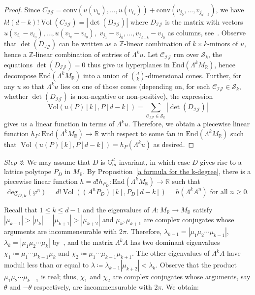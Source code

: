 \documentclass[11pt,a4paper]{article}
\theoremstyle{plain}
\theoremstyle{remark}
\theoremstyle{custombold}
\DeclareMathOperator{\vol}{Vol}
\begin{document}
\begin{proof}
Since $C_{\mathcal{I}\mathcal{J}}=\mathrm{conv}(u(v_{i_0}),\ldots,u(v_{i_k}))+\mathrm{conv}(v_{j_0},\ldots,v_{j_{d-k}})$, we have $k!(d-k)!\vol(C_{\mathcal{I}\mathcal{J}})=|\det (D_{\mathcal{I}\mathcal{J}})|$ where $D_{\mathcal{I}\mathcal{J}}$ is the matrix with vectors $u(v_{i_1}-v_{i_0}),\ldots,u(v_{i_k}-v_{i_0}),$  $v_{j_1}-v_{j_0},\ldots,v_{j_{d-k}}-v_{j_0}$ as columns, see~\cite[Lemma~2.5]{Huber-Sturmfels-1995}. Observe that $\det (D_{\mathcal I\mathcal J})$ can be written as a $\mathbb Z$-linear combination of $k\times k$-minors of $u$, hence a $\mathbb Z$-linear combination of entries of $\Lambda^ku$. Let $\mathcal{C}_{\mathcal{I}\mathcal{J}}$ run over $\mathcal{S}_k$, the equations $\det (D_{\mathcal{I}\mathcal{J}})=0$ thus give us hyperplanes in $\mathrm{End}(\Lambda^k M_\mathbb R)$, hence decompose $\mathrm{End}(\Lambda^k M_\mathbb R)$ into a union of $\binom{d}{k}$-dimensional cones. Further, for any $u$ so that $\Lambda^ku$ lies on one of those cones (depending on, for each $\mathcal{C}_{\mathcal{I}\mathcal{J}}\in \mathcal{S}_k$, whether $\det(D_{\mathcal{I}\mathcal{J}})$ is non-negative or non-positive), the expression 
$$\mathrm{Vol}(u(P)[k],P[d-k])=\sum_{\mathcal{C}_{\mathcal{I}\mathcal{J}}\in \mathcal{S}_k}|\det(D_{\mathcal{\mathcal{I}\mathcal{J}}})|$$
gives us a linear function in terms of $\Lambda^ku$. Therefore, we obtain a piecewise linear function $h_P\colon\mathrm{End}(\Lambda^kM_{\mathbb R})\rightarrow\mathbb R$ with respect to some fan in $\mathrm{End}(\Lambda^k M_\mathbb R)$ such that  $\vol(u(P)[k],P[d-k])=h_P(\Lambda^ku)$ as desired.
\end{proof}

\medskip
\noindent
\emph{Step 2}: We may assume that $D$ is $\mathbb G_m^d$-invariant, in which case $D$ gives rise to a lattice polytope $P_
D$ in $M_\mathbb R$. By Proposition~\ref{a formula for the k-degree}, there is a piecewise linear function $h=d!h_{P_D}\colon \mathrm{End}(\Lambda^kM_\mathbb R)\rightarrow\mathbb R$ such that 
$$\mathrm{deg}_{D,k}(\varphi^n)=d!\vol((A^nP_D)[k],P_D[d-k])=h(\Lambda^kA^n)\text{ for all }n\geq0.$$


Recall that $1\leq k\leq d-1$ and the eigenvalues of $A\colon M_\mathbb R\rightarrow M_\mathbb R$ satisfy $|\mu_{k-1}|>|\mu_k|=|\mu_{k+1}|>|\mu_{k+2}|$  and $\mu_{k},\mu_{k+1}$ are complex conjugates whose arguments are incommensurable with $2\pi$. Therefore, $\lambda_{k-1}=|\mu_1\mu_2\cdots\mu_{k-1}|$, $\lambda_k=|\mu_1\mu_2\cdots\mu_{k}|$ by~\cite[Corollary~B]{Favre-Wulcan-2012}, and the matrix $\Lambda^kA$ has two dominant eigenvalues $\chi_{1}\coloneqq \mu_1\cdots\mu_{k-1}\mu_{k}$ and $\chi_{2}\coloneqq \mu_1\cdots\mu_{k-1}\mu_{k+1}$. The other eigenvalues of $\Lambda^kA$ have moduli less than or equal to $\lambda\coloneqq \lambda_{k-1}|\mu_{k+2}|<\lambda_k$.  Observe that the product $\mu_1\mu_2\cdots\mu_{k-1}$ is real; thus, $\chi_1$ and $\chi_2$ are complex conjugates
whose arguments, say $\theta$ and $-\theta$ respectively, are incommensurable with $2\pi$. We obtain:
\end{document}
